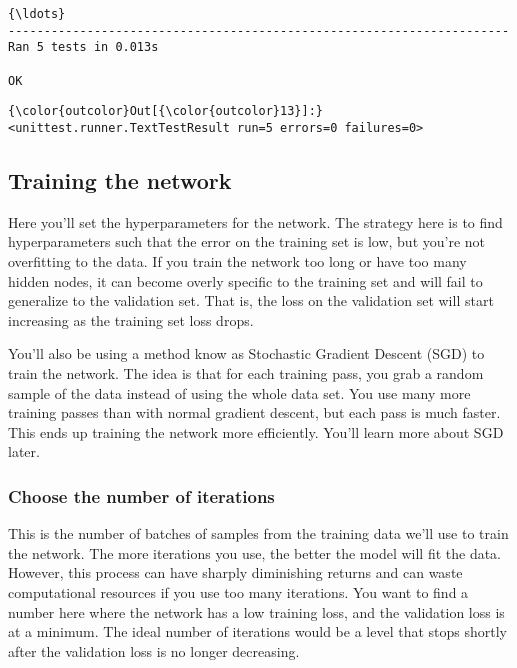 \documentclass[11pt]{article}
\begin{document}
    \begin{Verbatim}[commandchars=\\\{\}]
{\ldots}
----------------------------------------------------------------------
Ran 5 tests in 0.013s

OK

    \end{Verbatim}

\begin{Verbatim}[commandchars=\\\{\}]
{\color{outcolor}Out[{\color{outcolor}13}]:} <unittest.runner.TextTestResult run=5 errors=0 failures=0>
\end{Verbatim}
            
    \hypertarget{training-the-network}{%
\subsection{Training the network}\label{training-the-network}}

Here you'll set the hyperparameters for the network. The strategy here
is to find hyperparameters such that the error on the training set is
low, but you're not overfitting to the data. If you train the network
too long or have too many hidden nodes, it can become overly specific to
the training set and will fail to generalize to the validation set. That
is, the loss on the validation set will start increasing as the training
set loss drops.

You'll also be using a method know as Stochastic Gradient Descent (SGD)
to train the network. The idea is that for each training pass, you grab
a random sample of the data instead of using the whole data set. You use
many more training passes than with normal gradient descent, but each
pass is much faster. This ends up training the network more efficiently.
You'll learn more about SGD later.

\hypertarget{choose-the-number-of-iterations}{%
\subsubsection{Choose the number of
iterations}\label{choose-the-number-of-iterations}}

This is the number of batches of samples from the training data we'll
use to train the network. The more iterations you use, the better the
model will fit the data. However, this process can have sharply
diminishing returns and can waste computational resources if you use too
many iterations. You want to find a number here where the network has a
low training loss, and the validation loss is at a minimum. The ideal
number of iterations would be a level that stops shortly after the
validation loss is no longer decreasing.
\end{document}
